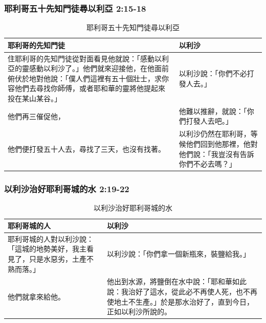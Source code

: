 \subsubsection{耶利哥五十先知門徒尋以利亞 2:15-18}
\begin{table}[H]
\hspace*{-7mm}
\centering
\begin{tabular}{p{11.5cm}|p{}}\hline\hline
耶利哥的先知門徒&以利沙\\\hline\hline
住耶利哥的先知門徒從對面看見他就說：「感動以利亞的靈感動以利沙了。」他們就來迎接他，在他面前俯伏於地對他說：「僕人們這裡有五十個壯士，求你容他們去尋找你師傅，或者耶和華的靈將他提起來投在某山某谷。」
&以利沙說：「你們不必打發人去。」\\\hline
他們再三催促他，&他難以推辭，就說：「你們打發人去吧。」\\\hline
他們便打發五十人去，尋找了三天，也沒有找著。&以利沙仍然在耶利哥，等候他們回到他那裡，他對他們說：「我豈沒有告訴你們不必去嗎？」\\\hline
\end{tabular}
\caption{耶利哥五十先知門徒尋以利亞}
\end{table}



\subsubsection{以利沙治好耶利哥城的水 2:19-22}
\begin{table}[H]
\centering
\begin{tabular}{p{}|p{}}\hline\hline
耶利哥城的人&以利沙\\\hline\hline
耶利哥城的人對以利沙說：「這城的地勢美好，我主看見了，只是水惡劣，土產不熟而落。」
&以利沙說：「你們拿一個新瓶來，裝鹽給我。」\\\hline
他們就拿來給他。&他出到水源，將鹽倒在水中說：「耶和華如此說：我治好了這水，從此必不再使人死，也不再使地土不生產。」於是那水治好了，直到今日，正如以利沙所說的。\\\hline
\end{tabular}
\caption{以利沙治好耶利哥城的水}
\end{table}


